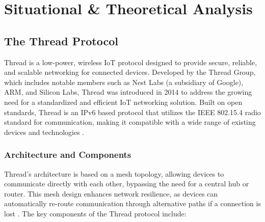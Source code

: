 \chapter{Situational \& Theoretical Analysis}\label{chap:situational_theoretical_analysis}

\section{The Thread Protocol}\label{sec:the_thread_protocol}
Thread is a low-power, wireless \gls{IoT} protocol designed to provide secure, reliable, and scalable networking for connected devices. Developed by the Thread Group, which includes notable members such as Nest Labs (a subsidiary of Google), \gls{ARM}, and Silicon Labs, Thread was introduced in 2014 to address the growing need for a standardized and efficient \gls{IoT} networking solution. Built on open standards, Thread is an \gls{IPv6} based protocol that utilizes the \gls{IEEE} 802.15.4 radio standard for communication, making it compatible with a wide range of existing devices and technologies \cite{Thread_Group_Fundamentals}.


\subsection{Architecture and Components}
Thread's architecture is based on a mesh topology, allowing devices to communicate directly with each other, bypassing the need for a central hub or router. This mesh design enhances network resilience, as devices can automatically re-route communication through alternative paths if a connection is lost \cite{Thread_Group_Fundamentals}. The key components of the Thread protocol include:

